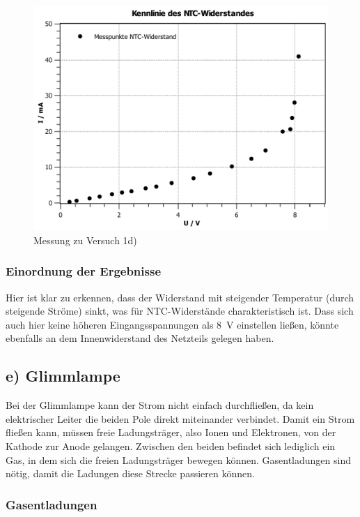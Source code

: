 \documentclass[11pt,a4paper,titlepage, ngerman]{article}
\begin{document}
				\begin{figure}
					\centering
					\includegraphics[width=\textwidth]{KennlinieNTCsubgitter.pdf}
					\caption{Messung zu Versuch 1d)}
					\label{KL d}
				\end{figure}
			
			\subsubsection*{Einordnung der Ergebnisse}
			
				Hier ist klar zu erkennen, dass der Widerstand mit steigender Temperatur (durch steigende Ströme) sinkt, was für NTC-Widerstände charakteristisch ist. 
				Dass sich auch hier keine höheren Eingangsspannungen als \SI{8}{\V} einstellen ließen, könnte ebenfalls an dem Innenwiderstand des Netzteils gelegen haben.
			
		\subsection{e) Glimmlampe} 
			
			Bei der Glimmlampe kann der Strom nicht einfach durchfließen, da kein elektrischer Leiter die beiden Pole direkt miteinander verbindet.
			Damit ein Strom fließen kann, müssen freie Ladungsträger, also Ionen und Elektronen, von der Kathode zur Anode gelangen.
			Zwischen den beiden befindet sich lediglich ein Gas, in dem sich die freien Ladungsträger bewegen können. Gasentladungen sind nötig, damit die Ladungen diese Strecke passieren können.
			
			\subsubsection*{Gasentladungen}
			
\end{document}

